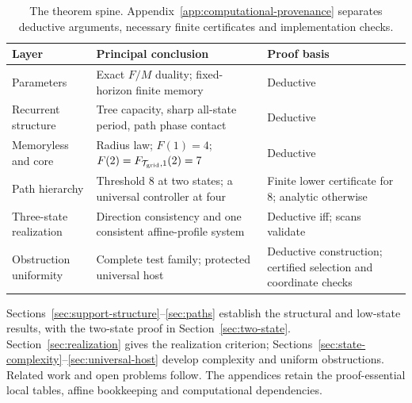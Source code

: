 \begin{table}[!htbp]
\centering\small
\begin{tabularx}{\linewidth}{@{}P{.21\linewidth}YP{.24\linewidth}@{}}
\toprule
Layer & Principal conclusion & Proof basis \\
\midrule
Parameters & Exact $F/M$ duality; fixed-horizon finite memory & Deductive \\
Recurrent structure & Tree capacity, sharp all-state period, path phase contact & Deductive \\
Memoryless and core & Radius law; $F(1)=4$; $F(2)=F_{\mathcal T_{\rm grid},1}(2)=7$ & Deductive \\
Path hierarchy & Threshold $8$ at two states; a universal controller at four & Finite lower certificate for $8$; analytic otherwise \\
Three-state realization & Direction consistency and one consistent affine-profile system & Deductive iff; scans validate \\
Obstruction uniformity & Complete test family; protected universal host & Deductive construction; certified selection and coordinate checks \\
\bottomrule
\end{tabularx}
\caption{The theorem spine. Appendix~\ref{app:computational-provenance} separates deductive arguments, necessary finite certificates and implementation checks.}
\label{tab:theorem-summary}
\end{table}

Sections~\ref{sec:support-structure}--\ref{sec:paths} establish the structural and
low-state results, with the two-state proof in Section~\ref{sec:two-state}.
Section~\ref{sec:realization} gives the realization criterion;
Sections~\ref{sec:state-complexity}--\ref{sec:universal-host} develop complexity and
uniform obstructions. Related work and open problems follow. The appendices retain
the proof-essential local tables, affine bookkeeping and computational dependencies.
